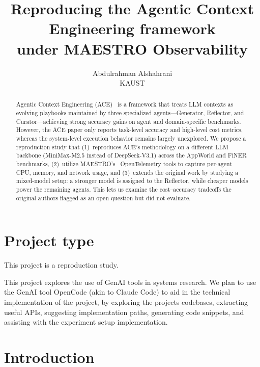 \documentclass[letterpaper,twocolumn,10pt]{article}
\begin{document}
\date{}


\title{\Large \bf Reproducing the Agentic Context Engineering framework\\under MAESTRO Observability}

\author{
{\rm Abdulrahman Alshahrani}\\
KAUST
}

\maketitle

\begin{abstract}
Agentic Context Engineering (ACE)~\cite{zhang2025agenticcontextengineeringevolving} is a framework that treats LLM contexts as evolving playbooks maintained by three specialized agents---Generator, Reflector, and Curator---achieving strong accuracy gains on agent and domain-specific benchmarks. However, the ACE paper only reports task-level accuracy and high-level cost metrics, whereas the system-level execution behavior remains largely unexplored. We propose a reproduction study that (1)~reproduces ACE's methodology on a different LLM backbone (MiniMax-M2.5 instead of DeepSeek-V3.1) across the AppWorld and FiNER benchmarks, (2)~utilize MAESTRO's~\cite{maestro} OpenTelemetry tools to capture per-agent CPU, memory, and network usage, and (3)~extends the original work by studying a mixed-model setup: a stronger model is assigned to the Reflector, while cheaper models power the remaining agents. This lets us examine the cost–accuracy tradeoffs the original authors flagged as an open question but did not evaluate.
\end{abstract}

\section{Project type}

This project is a reproduction study.

This project explores the use of GenAI tools in systems research. We plan to use the GenAI tool OpenCode \cite{anomalyco_opencode} (akin to Claude Code) to aid in the technical implementation of the project, by exploring the projects codebases, extracting useful APIs, suggesting implementation paths, generating code snippets, and assisting with the experiment setup implementation.

\section{Introduction}
\end{document}
